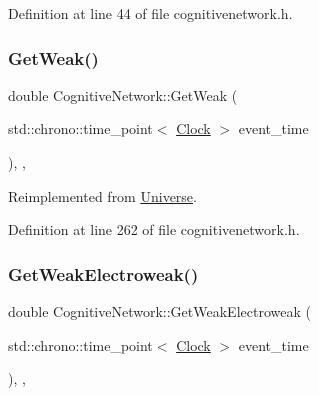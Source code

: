 Definition at line 44 of file cognitivenetwork.\+h.

\mbox{\label{class_cognitive_network_a761db75ac8eab7b4625e5a398891bd12}} 
\subsubsection{\texorpdfstring{Get\+Weak()}{GetWeak()}}
{\footnotesize\ttfamily double Cognitive\+Network\+::\+Get\+Weak (\begin{DoxyParamCaption}\item[{std\+::chrono\+::time\+\_\+point$<$ \mbox{\hyperlink{universe_8h_a0ef8d951d1ca5ab3cfaf7ab4c7a6fd80}{Clock}} $>$}]{event\+\_\+time }\end{DoxyParamCaption})\hspace{0.3cm}{\ttfamily [inline]}, {\ttfamily [final]}, {\ttfamily [virtual]}}



Reimplemented from \mbox{\hyperlink{class_universe_a4476b7e0a3fc1764909f556257fd9ec7}{Universe}}.



Definition at line 262 of file cognitivenetwork.\+h.

\mbox{\label{class_cognitive_network_aa6342c390fe8e7c648b4c6bc8f93ba4a}} 
\subsubsection{\texorpdfstring{Get\+Weak\+Electroweak()}{GetWeakElectroweak()}}
{\footnotesize\ttfamily double Cognitive\+Network\+::\+Get\+Weak\+Electroweak (\begin{DoxyParamCaption}\item[{std\+::chrono\+::time\+\_\+point$<$ \mbox{\hyperlink{universe_8h_a0ef8d951d1ca5ab3cfaf7ab4c7a6fd80}{Clock}} $>$}]{event\+\_\+time }\end{DoxyParamCaption})\hspace{0.3cm}{\ttfamily [inline]}, {\ttfamily [final]}, {\ttfamily [virtual]}}



